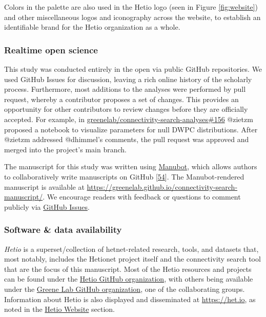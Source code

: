 Colors in the palette are also used in the Hetio logo (seen in Figure \ref{fig:website}) and other miscellaneous logos and iconography across the website, to establish an identifiable brand for the Hetio organization as a whole.

\hypertarget{realtime-open-science}{%
\subsubsection{Realtime open science}\label{realtime-open-science}}

This study was conducted entirely in the open via public GitHub repositories.
We used GitHub Issues for discussion, leaving a rich online history of the scholarly process.
Furthermore, most additions to the analyses were performed by pull request,
whereby a contributor proposes a set of changes.
This provides an opportunity for other contributors to review changes before they are officially accepted.
For example, in \href{https://github.com/greenelab/connectivity-search-analyses/pull/156}{greenelab/connectivity-search-analyses\#156} @zietzm proposed a notebook to visualize parameters for null DWPC distributions.
After @zietzm addressed @dhimmel's comments, the pull request was approved and merged into the project's main branch.

The manuscript for this study was written using \href{https://manubot.org/}{Manubot}, which allows authors to collaboratively write manuscripts on GitHub {[}\protect\hyperlink{ref-YuJbg3zO}{54}{]}.
The Manubot-rendered manuscript is available at \url{https://greenelab.github.io/connectivity-search-manuscript/}.
We encourage readers with feedback or questions to comment publicly via \href{https://github.com/greenelab/connectivity-search-manuscript/issues}{GitHub Issues}.

\hypertarget{software-data-availability}{%
\subsubsection{Software \& data availability}\label{software-data-availability}}

\emph{Hetio} is a superset/collection of hetnet-related research, tools, and datasets that, most notably, includes the Hetionet project itself and the connectivity search tool that are the focus of this manuscript.
Most of the Hetio resources and projects can be found under the \href{https://github.com/hetio}{Hetio GitHub organization}, with others being available under the \href{https://github.com/greenelab}{Greene Lab GitHub organization}, one of the collaborating groups.
Information about Hetio is also displayed and disseminated at \url{https://het.io}, as noted in the \protect\hyperlink{hetio-website}{Hetio Website} section.

